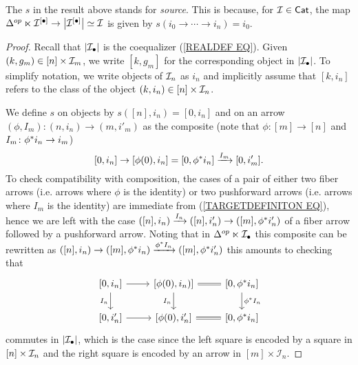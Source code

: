 \documentclass[a4paper,10pt]{article}%
\begin{document}
\begin{remark}
	The $s$ in the result above stands for \textit{source}. 
	This is because, for $\mathcal{I} \in \mathsf{Cat}$, the map
	$\Delta^{op} \ltimes \mathcal{I}^{[\bullet]}
	\to \left| \mathcal{I}^{[\bullet]} \right|
	\simeq \mathcal{I}$ is given by $s(i_0\to \cdots \to i_n) = i_0$.
\end{remark}


\begin{proof}
Recall that $|\mathcal{I}_{\bullet}|$ is the coequalizer (\ref{REALDEF EQ}). Given $(k,g_m) \in [n] \times \mathcal{I}_m$, we write 
$[k,g_m]$ for the corresponding object in $|\mathcal{I}_{\bullet}|$.
To simplify notation, we write objects of $\mathcal{I}_n$ as $i_n$
and implicitly assume that $[k,i_n]$ refers to the class of the object $(k,i_n) \in [n] \times \mathcal{I}_n$.


We define $s$ on objects by 
$s([n],i_n)=[0,i_n]$ and on an arrow 
$(\phi,I_m)\colon (n,i_n) \to (m,i'_m)$ as the composite
(note that $\phi\colon [m] \to [n]$ and $I_m\colon \phi^{\**}i_n\to i_m$)
\begin{equation}\label{TARGETDEFINITON EQ}
	[0,i_n] \to [\phi(0),i_n] =
	[0,\phi^{\**}i_n]	
	 \xrightarrow{I_m} 
	[0,i'_m].
\end{equation}
To check compatibility with composition,
the cases of a pair of either two fiber arrows (i.e. arrows where $\phi$ is the identity) or two pushforward arrows (i.e. arrows where $I_m$ is the identity) are immediate from (\ref{TARGETDEFINITON EQ}), 
hence we are left with the case 
$([n],i_n) \xrightarrow{I_n} ([n],i'_n) \to 
([m],\phi^{\**} i'_n)$
 of a fiber arrow followed by a pushforward arrow. 
 Noting that in $\Delta^{op} \ltimes \mathcal{I}_{\bullet}$
this composite can be rewritten as
$([n],i_n) \to ([m],\phi^{\**} i_n)
\xrightarrow{\phi^{\**}I_n} 
([m],\phi^{\**}i'_n)$
 this amounts to checking that
\[
\begin{tikzcd}
\left[0,i_n\right] \ar{r} \ar{d}[swap]{I_n} &
\left[\phi(0),i_n) \right] \ar[equal]{r} \ar{d}[swap]{I_n} &
\left[0,\phi^{\**} i_n \right] \ar{d}{\phi^{\**} I_n}
	\\
\left[0,i'_n\right] \ar{r} &
\left[\phi(0),i'_n\right] \ar[equal]{r} &
\left[0,\phi^{\**} i_n \right]
\end{tikzcd}
\]
commutes in $|\mathcal{I}_{\bullet}|$,
which is the case since the left square is encoded by a square in $[n]\times \mathcal{I}_n$
and the right square is encoded by an arrow in $[m]\times \mathcal{I}_n$.


\end{proof}
\end{document}
